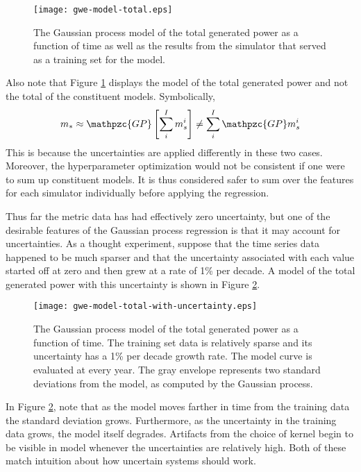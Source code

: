 \documentclass{ntmanuscript}
\newcommand{\GP}{\mathpzc{GP}}
\begin{document}
\begin{figure}[htb]
\centering
\texttt{[image: gwe-model-total.eps]}
\caption{The Gaussian process model of the total generated power
as a function of time as well as the results from the simulator that served as a
training set for the model.}
\label{gwe-model-total}
\end{figure}

\clearpage

Also note that Figure \ref{gwe-model-total} displays the model of the total
generated power and not the total of the constituent models. Symbolically,
\begin{equation}
\label{total-model}
m_* \approx \GP \left[\sum_i^I m_s^i\right] \ne \sum_i^I \GP m_s^i
\end{equation}
This is because the uncertainties are applied differently in these two cases.
Moreover, the hyperparameter
optimization would not be consistent if one were to sum up constituent
models. It is thus considered safer
to sum over the features for each simulator individually before applying the
regression.

Thus far the metric data has had effectively zero uncertainty, but one of the
desirable features of the Gaussian process regression is that it may account
for uncertainties. As a thought experiment, suppose that the time
series data happened to be much sparser and that
the uncertainty associated with each value started off at zero and then grew at
a rate of 1\% per decade. A model of the total generated power with this uncertainty
is shown in Figure \ref{gwe-model-total-with-uncertainty}.

\begin{figure}[htb]
\centering
\texttt{[image: gwe-model-total-with-uncertainty.eps]}
\caption{The Gaussian process model of the total generated power
as a function of time. The training set data is relatively sparse and its uncertainty
has a 1\% per decade growth rate. The model curve is evaluated at every year. The
gray envelope represents two standard deviations from the model, as computed by
the Gaussian process.}
\label{gwe-model-total-with-uncertainty}
\end{figure}

In Figure \ref{gwe-model-total-with-uncertainty}, note that as the model moves
farther in time from the training data the standard deviation grows. Furthermore,
as the uncertainty in the training data grows, the model itself degrades. Artifacts
from the choice of kernel begin to be visible in model whenever the uncertainties are
relatively high. Both of these match intuition about how uncertain systems should
work.
\end{document}
